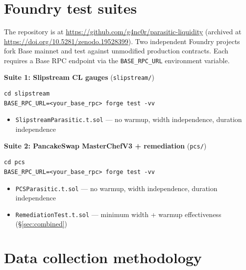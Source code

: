 \documentclass[11pt,a4paper]{article}
\theoremstyle{definition}
\begin{document}
\section{Foundry test suites}\label{app:foundry}

The repository is at \url{https://github.com/g4nc0r/parasitic-liquidity} (archived at \url{https://doi.org/10.5281/zenodo.19528399}). Two independent Foundry projects fork Base mainnet and test against unmodified production contracts. Each requires a Base RPC endpoint via the \texttt{BASE\_RPC\_URL} environment variable.

\textbf{Suite 1: Slipstream CL gauges} (\texttt{slipstream/})

\begin{center}\begin{minipage}{0.85\textwidth}\begin{verbatim}
cd slipstream
BASE_RPC_URL=<your_base_rpc> forge test -vv
\end{verbatim}\end{minipage}\end{center}

\begin{itemize}[leftmargin=2em]
\item \texttt{SlipstreamParasitic.t.sol} --- no warmup, width independence, duration independence
\end{itemize}

\textbf{Suite 2: PancakeSwap MasterChefV3 + remediation} (\texttt{pcs/})

\begin{center}\begin{minipage}{0.85\textwidth}\begin{verbatim}
cd pcs
BASE_RPC_URL=<your_base_rpc> forge test -vv
\end{verbatim}\end{minipage}\end{center}

\begin{itemize}[leftmargin=2em]
\item \texttt{PCSParasitic.t.sol} --- no warmup, width independence, duration independence
\item \texttt{RemediationTest.t.sol} --- minimum width + warmup effectiveness (\S\ref{sec:combined})
\end{itemize}

\section{Data collection methodology}
\end{document}
